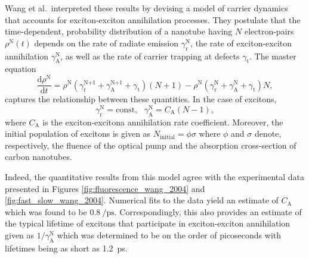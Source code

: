 Wang et al.\ interpreted these results by devising a model of carrier dynamics that accounts for exciton-exciton annihilation processes. They postulate that the time-dependent, probability distribution of a nanotube having $N$ electron-pairs $\rho^\text{N}(t)$ depends on the rate of radiate emission $\gamma^\text{N}_\text{r}$, the rate of exciton-exciton annihilation $\gamma^\text{N}_\text{A}$, as well as the rate of carrier trapping at defects $\gamma_\text{t}$. The master equation
\begin{equation}
	\dfrac{\mathrm{d}\rho^\text{N}}{\mathrm{d} t} = \rho^\text{N}(\gamma^\text{N+1}_\text{r} + \gamma^\text{N+1}_\text{A} + \gamma_\text{t})(N+1) - \rho^\text{N}(\gamma^\text{N}_\text{r} + \gamma^\text{N}_\text{A} + \gamma_\text{t})N,
\end{equation}
captures the relationship between these quantities. In the case of excitons,
\begin{equation}
	\gamma^\text{N}_\text{r} = \text{const}, \text{   } \gamma^\text{N}_\text{A} = C_\text{A}(N-1),
\end{equation}
where $C_\text{A}$ is the exciton-excitona annihilation rate coefficient. Moreover, the initial population of excitons is given as $N_\text{initial} = \phi \sigma$ where $\phi$ and $\sigma$ denote, respectively, the fluence of the optical pump and the absorption cross-section of carbon nanotubes.

Indeed, the quantitative results from this model agree with the experimental data presented in Figures \ref{fig:fluorescence_wang_2004} and \ref{fig:fast_slow_wang_2004}. Numerical fits to the data yield an estimate of $C_\text{A}$ which was found to be $\SI{0.8}{\per\pico\second}$. Correspondingly, this also provides an estimate of the typical lifetime of excitons that participate in exciton-exciton annihilation given as $1/\gamma^\text{N}_\text{A}$ which was determined to be on the order of picoseconds with lifetimes being as short as \SI{1.2}{\pico \second}.


